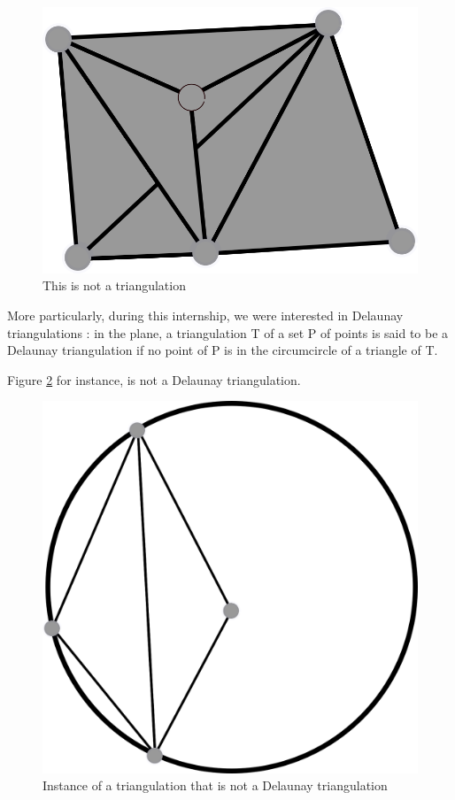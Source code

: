 \documentclass[a4paper,10pt]{article}
\begin{document}
\begin{figure}
  \centering
  \caption{\label{NotTrig2} This is not a triangulation}
  \includegraphics[scale=2]{NotTrig2}
\end{figure}


More particularly, during this internship, we were interested in Delaunay triangulations : in the plane, a triangulation T of a set P of points is said to be a Delaunay triangulation if no point of P is in the circumcircle of a triangle of T.

Figure \ref{notDelaunay} for instance, is not a Delaunay triangulation.

\begin{figure}[h]
\centering
\caption{\label{notDelaunay} Instance of a triangulation that is not a Delaunay triangulation}

\includegraphics[scale=1]{dessin2}

\end{figure}
\end{document}
